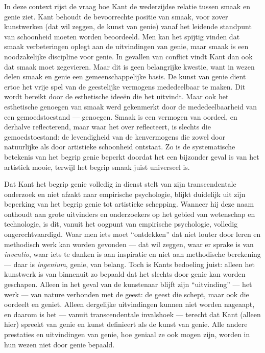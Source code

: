 In deze context rijst de vraag hoe Kant de wederzijdse relatie tussen smaak en genie ziet. Kant behoudt de bevoorrechte positie van smaak, voor zover kunstwerken (dat wil zeggen, de kunst van genie) vanaf het leidende standpunt van schoonheid moeten worden beoordeeld. Men kan het spijtig vinden dat smaak verbeteringen oplegt aan de uitvindingen van genie, maar smaak is een noodzakelijke discipline voor genie. In gevallen van conflict vindt Kant dan ook dat smaak moet zegevieren. Maar dit is geen belangrijke kwestie, want in wezen delen smaak en genie een gemeenschappelijke basis. De kunst van genie dient ertoe het vrije spel van de geestelijke vermogens mededeelbaar te maken. Dit wordt bereikt door de esthetische ideeën die het uitvindt. Maar ook het esthetische genoegen van smaak werd gekenmerkt door de mededeelbaarheid van een gemoedstoestand — genoegen. Smaak is een vermogen van oordeel, en derhalve reflecterend, maar waar het over reflecteert, is slechts die gemoedstoestand: de levendigheid van de kenvermogens die zowel door natuurlijke als door artistieke schoonheid ontstaat. Zo is de systematische betekenis van het begrip genie beperkt doordat het een bijzonder geval is van het artistiek mooie, terwijl het begrip smaak juist universeel is.

Dat Kant het begrip genie volledig in dienst stelt van zijn transcendentale onderzoek en niet afzakt naar empirische psychologie, blijkt duidelijk uit zijn beperking van het begrip genie tot artistieke schepping. Wanneer hij deze naam onthoudt aan grote uitvinders en onderzoekers op het gebied van wetenschap en technologie, is dit, vanuit het oogpunt van empirische psychologie, volledig ongerechtvaardigd. Waar men iets moet ``ontdekken'' dat niet louter door leren en methodisch werk kan worden gevonden — dat wil zeggen, waar er sprake is van \textit{inventio}, waar iets te danken is aan inspiratie en niet aan methodische berekening — daar is \textit{ingenium}, genie, van belang. Toch is Kants bedoeling juist: alleen het kunstwerk is van binnenuit zo bepaald dat het slechts door genie kan worden geschapen. Alleen in het geval van de kunstenaar blijft zijn ``uitvinding'' — het werk — van nature verbonden met de geest: de geest die schept, maar ook die oordeelt en geniet. Alleen dergelijke uitvindingen kunnen niet worden nageaapt, en daarom is het — vanuit transcendentale invalshoek — terecht dat Kant (alleen hier) spreekt van genie en kunst definieert als de kunst van genie. Alle andere prestaties en uitvindingen van genie, hoe geniaal ze ook mogen zijn, worden in hun wezen niet door genie bepaald.

